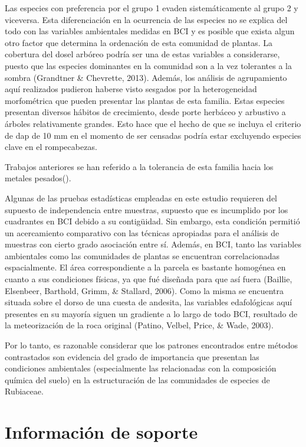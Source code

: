 \documentclass[11pt,]{article}
\begin{document}
Las especies con preferencia por el grupo 1 evaden sistemáticamente al
grupo 2 y viceversa. Esta diferenciación en la ocurrencia de las
especies no se explica del todo con las variables ambientales medidas en
BCI y es posible que exista algun otro factor que determina la
ordenación de esta comunidad de plantas. La cobertura del dosel arbóreo
podría ser una de estas variables a considerarse, puesto que las
especies dominantes en la comunidad son a la vez tolerantes a la sombra
(Grandtner \& Chevrette, 2013). Además, los análisis de agrupamiento
aquí realizados pudieron haberse visto sesgados por la heterogeneidad
morfométrica que pueden presentar las plantas de esta familia. Estas
especies presentan diversos hábitos de crecimiento, desde porte herbáceo
y arbustivo a árboles relativamente grandes. Esto hace que el hecho de
que se incluya el criterio de dap de 10 mm en el momento de ser censadas
podría estar excluyendo especies clave en el rompecabezas.

Trabajos anteriores se han referido a la tolerancia de esta familia
hacia los metales pesados().

Algunas de las pruebas estadísticas empleadas en este estudio requieren
del supuesto de independencia entre muestras, supuesto que es incumplido
por los cuadrantes en BCI debido a su contigüidad. Sin embargo, esta
condición permitió un acercamiento comparativo con las técnicas
apropiadas para el análisis de muestras con cierto grado asociación
entre sí. Además, en BCI, tanto las variables ambientales como las
comunidades de plantas se encuentran correlacionadas espacialmente. El
área correspondiente a la parcela es bastante homogénea en cuanto a sus
condiciones físicas, ya que fué diseñada para que así fuera (Baillie,
Elsenbeer, Barthold, Grimm, \& Stallard, 2006). Como la misma se
encuentra situada sobre el dorso de una cuesta de andesita, las
variables edafológicas aquí presentes en su mayoría siguen un gradiente
a lo largo de todo BCI, resultado de la meteorización de la roca
original (Patino, Velbel, Price, \& Wade, 2003).

Por lo tanto, es razonable considerar que los patrones encontrados entre
métodos contrastados son evidencia del grado de importancia que
presentan las condiciones ambientales (especialmente las relacionadas
con la composición química del suelo) en la estructuración de las
comunidades de especies de Rubiaceae.

\section {Información de soporte} \label{inf_supletary}
\end{document}
